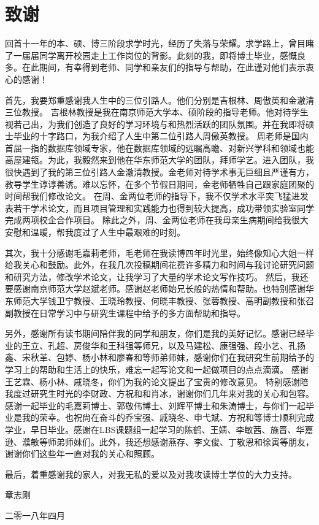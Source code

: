 {\kaishu
\chapter*{致\qquad 谢}
\begin{spacing}{1.5}
	
	
回首十一年的本、硕、博三阶段求学时光，经历了失落与荣耀。求学路上，曾目睹了一届届同学离开校园走上工作岗位的背影。此刻的我，即将博士毕业，感慨良多。在此期间，有幸得到老师、同学和亲友们的指导与帮助，在此谨对他们表示衷心的感谢！
	
首先，我要郑重感谢我人生中的三位引路人。他们分别是吉根林、周傲英和金澈清三位教授。
吉根林教授是我在南京师范大学本、硕阶段的指导老师。他对待学生视若己出，为我们创造了良好的学习环境与和热烈活跃的团队氛围。并在我即将硕士毕业的十字路口，为我介绍了人生中第二位引路人周傲英教授。
周老师是国内首屈一指的数据库领域专家，他在数据库领域的远瞩高瞻、对新兴学科和领域也能高屋建瓴。为此，我毅然来到他在华东师范大学的团队，拜师学艺。进入团队，我很快遇到了我的第三位引路人金澈清教授。金老师对待学术事无巨细且严谨有方，教导学生谆谆善诱。难以忘怀，在多个节假日期间，金老师牺牲自己跟家庭团聚的时间帮我们修改论文。
在周、金两位老师的指导下，我不仅学术水平突飞猛进发表若干学术论文，而且项目管理和实践能力也得到较大提高，成功带领实验室同学完成两项校企合作项目。
除此之外，周、金两位老师在我母亲生病期间给我很大安慰和温暖，帮我度过了人生中最艰难的时刻。


其次，我十分感谢毛嘉莉老师，毛老师在我读博四年时光里，始终像知心大姐一样给我关心和鼓励。此外，在我几次投稿期间花费许多精力和时间与我讨论研究问题和研究方法，修改学术论文，让我学习了大量的学术论文写作技巧。
然后，我还要感谢南京师范大学赵斌老师。感谢赵老师始兄长般的热情和帮助。也特别感谢华东师范大学钱卫宁教授、王晓玲教授、何晓丰教授、张蓉教授、高明副教授和张召副教授在日常学习中与研究生课程中给予的多方面帮助和指导。


另外，感谢所有读书期间陪伴我的同学和朋友，你们是我的美好记忆。感谢已经毕业的王立、孔超、房俊华和王科强等师兄，以及马建松、康强强、段小艺、孔扬鑫、宋秋革、包婷、杨小林和廖春和等师弟师妹，感谢你们在我研究生前期给予的学习上的帮助和生活上的快乐，难忘一起写论文和一起做项目的点点滴滴。
感谢王艺霖、杨小林、戚晓冬，你们为我的论文提出了宝贵的修改意见。
特别感谢陪我度过研究生时光的李财政、方祝和和肖冰，谢谢你们几年来对我的关心和包容。
感谢一起毕业的毛嘉莉博士、郭敬伟博士、刘辉平博士和朱涛博士，与你们一起毕业是我的荣幸。也祝尙在奋斗的乔宝强、戚晓冬、申弋斌、方祝和等博士顺利完成学业，早日毕业。感谢在LBS课题组一起学习的陈鹤、王婧、李敏茜、施晋、华嘉逊、濮敏等师弟师妹们。此外，我还想感谢燕存、李文俊、丁敬恩和徐寅等朋友，谢谢你们这些年一直对我的关心和照顾。

最后，着重感谢我的家人，对我无私的爱以及对我攻读博士学位的大力支持。

\end{spacing}
\vspace{0cm} \hspace{10.8cm}  章志刚

\hspace{9.8cm}  二零一八年四月 }
